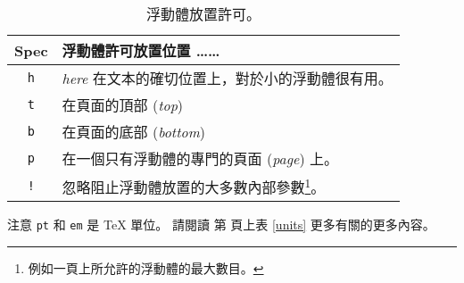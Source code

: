 \begin{table}[!bp]
\caption{浮動體放置許可。}\label{tab:permiss} \noindent
\begin{minipage}{\textwidth}
\medskip
\begin{center}
\begin{tabular}{@{}cp{8cm}@{}}
Spec&浮動體許可放置位置 ……\\
\hline
\rule{0pt}{1.05em}\texttt{h} & \emph{here} 在文本的確切位置上，對於小的浮動體很有用。\\[0.3ex]
\texttt{t} & 在頁面的頂部 (\emph{top})\\[0.3ex]
\texttt{b} & 在頁面的底部 (\emph{bottom})\\[0.3ex]
\texttt{p} & 在一個只有浮動體的專門的頁面 (\emph{page}) 上。\\[0.3ex]
\texttt{!} &
忽略阻止浮動體放置的大多數內部參數\footnote{例如一頁上所允許的浮動體的最大數目。}。
\end{tabular}
\end{center}
注意 \texttt{pt} 和 \texttt{em} 是 \TeX{} 單位。
請閱讀 第 \pageref{units} 頁上表 \ref{units} 更多有關的更多內容。
\end{minipage}
\end{table}


